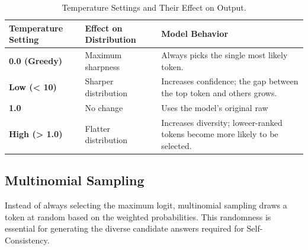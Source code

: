 \begin{table}[H]
  \centering
  \caption{Temperature Settings and Their Effect on Output.}
  \label{tab:temperature-settings}
  \begin{tabularx}{\textwidth}{@{}>{\centering\arraybackslash\bfseries}p{} X X@{}}
    \toprule
    \normalfont\textbf{Temperature Setting} & \textbf{Effect on Distribution} & \textbf{Model Behavior} \\
    \midrule
    \textbf{0.0 (Greedy)} & Maximum sharpness & Always picks the single most likely token. \\
    \addlinespace
    \textbf{Low (< 10)} & Sharper distribution & Increases confidence; the gap between the top token and others grows. \\
    \addlinespace
    \textbf{1.0} & No change & Uses the model's original raw \\
    \textbf{High (> 1.0)} & Flatter distribution & Increases diversity; loweer-ranked tokens become more likely to be selected. \\
    \bottomrule
  \end{tabularx}
\end{table}

\subsection{Multinomial Sampling}

Instead of always selecting the maximum logit, multinomial sampling draws a token at random based on the weighted probabilities. This randomness is essential for generating the diverse candidate answers required for Self-Consistency.